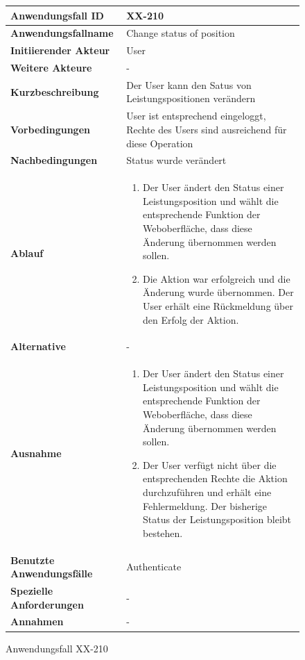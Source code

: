 \begin{figure}[h]
	\centering
	\begin{tabularx}{\textwidth}{ X | X }
		\textbf{Anwendungsfall ID} & XX-210 \\ \hline
		\textbf{Anwendungsfallname} & Change status of position\\ \hline
		\textbf{Initiierender Akteur} & User \\ \hline
		\textbf{Weitere Akteure} & -  \\ \hline
		\textbf{Kurzbeschreibung} & Der User kann den Satus von Leistungspositionen ver\"andern \\ \hline
		\textbf{Vorbedingungen} & User ist entsprechend eingeloggt, Rechte des Users sind ausreichend f\"ur diese Operation \\ \hline
		\textbf{Nachbedingungen} & Status wurde ver\"andert \\ \hline
		\textbf{Ablauf} &
		\begin{enumerate}
			\item Der User \"andert den Status einer Leistungsposition und w\"ahlt die entsprechende Funktion der Weboberfl\"ache, dass diese \"Anderung \"ubernommen werden sollen.
			\item Die Aktion war erfolgreich und die \"Anderung wurde \"ubernommen.  Der User erh\"alt eine R\"uckmeldung \"uber den Erfolg der Aktion.
		\end{enumerate} \\ \hline
		\textbf{Alternative} & -
		\\ \hline
		\textbf{Ausnahme} &
		\begin{enumerate}
			\item Der User \"andert den Status einer Leistungsposition und w\"ahlt die entsprechende Funktion der Weboberfl\"ache,  dass diese \"Anderung \"ubernommen werden sollen.
			\item Der User verf\"ugt nicht \"uber die entsprechenden Rechte die Aktion durchzuf\"uhren und erh\"alt eine Fehlermeldung. Der bisherige Status der Leistungsposition bleibt bestehen.
		\end{enumerate}  \\ \hline
		\textbf{Benutzte Anwendungsfälle} & Authenticate \\ \hline
		\textbf{Spezielle Anforderungen} & - \\ \hline
		\textbf{Annahmen} & -
	\end{tabularx}
	\caption{Anwendungsfall XX-210}
	\label{fig:anwendungsfall-server-tabelle-xx-5}
\end{figure}

